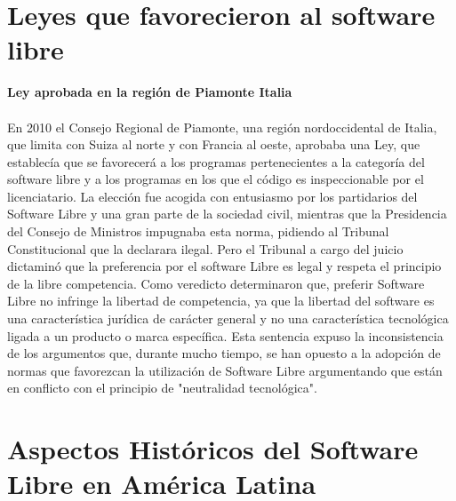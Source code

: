\section{Leyes que favorecieron al software libre}

{\bf Ley aprobada en la región de Piamonte Italia}
\\
\\
En 2010 el Consejo Regional de Piamonte, una región nordoccidental de Italia, que limita con Suiza al norte y con Francia al oeste, aprobaba una Ley, que establecía que se favorecerá a los programas pertenecientes a la categoría del software libre y a los programas en los que el código es inspeccionable por el licenciatario.
La elección fue acogida con entusiasmo por los partidarios del Software Libre y una gran parte de la sociedad civil, mientras que la Presidencia del Consejo de Ministros impugnaba esta norma, pidiendo al Tribunal Constitucional que la declarara ilegal. Pero el Tribunal a cargo del juicio dictaminó que la preferencia por el software Libre es legal y respeta el principio de la libre competencia.
Como veredicto determinaron que, preferir Software Libre no infringe la libertad de competencia, ya que la libertad del software es una característica jurídica de carácter general y no una característica tecnológica ligada a un producto o marca específica. Esta sentencia expuso la inconsistencia de los argumentos que, durante mucho tiempo, se han opuesto a la adopción de normas que favorezcan la utilización de Software Libre argumentando que están en conflicto con el principio de "neutralidad tecnológica".


\section{Aspectos Históricos del Software Libre en América Latina}

